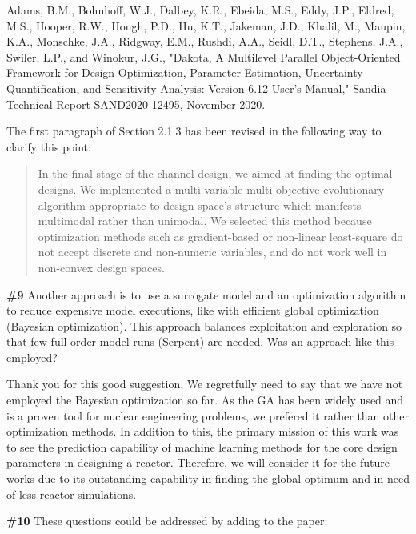 \documentclass{ar2rc}
\begin{document}
    Adams, B.M., Bohnhoff, W.J., Dalbey, K.R., Ebeida, M.S., Eddy, J.P., Eldred, M.S., Hooper, R.W., Hough, P.D., Hu, K.T., Jakeman, J.D., Khalil, M., Maupin, K.A., Monschke, J.A., Ridgway, E.M., Rushdi, A.A., Seidl, D.T., Stephens, J.A., Swiler, L.P., and Winokur, J.G., "Dakota, A Multilevel Parallel Object-Oriented Framework for Design Optimization, Parameter Estimation, Uncertainty Quantification, and Sensitivity Analysis: Version 6.12 User’s Manual," Sandia Technical Report SAND2020-12495, November 2020.

    The first paragraph of Section 2.1.3 has been revised in the following way  to clarify this point:\\

    \begin{quote}
        In the final stage of the channel design, we aimed at finding the optimal designs. We implemented a multi-variable multi-objective evolutionary algorithm appropriate to design space's structure which manifests multimodal rather than unimodal. We selected this method because optimization methods such as gradient-based or non-linear least-square do not accept discrete and non-numeric variables, and do not work well in non-convex design spaces.
    \end{quote}


    \Comment \textbf{\#9} Another approach is to use a surrogate model and an optimization
    algorithm to reduce expensive model executions, like with efficient global
    optimization (Bayesian optimization). This approach balances exploitation
    and exploration so that few full-order-model runs (Serpent) are needed. Was
    an approach like this employed?

    \Response Thank you for this good suggestion. We regretfully need to say that we have not employed the Bayesian optimization so far. As the GA has been widely used and is a proven tool for nuclear engineering problems, we prefered it rather than other optimization methods. In addition to this, the primary mission of this work was to see the prediction capability of machine learning methods for the core design parameters in designing a reactor. Therefore, we will consider it for the future works due to its outstanding capability in finding the global optimum and in need of less reactor simulations.


    \Comment \textbf{\#10} These questions could be addressed by adding to the paper:
\end{document}
